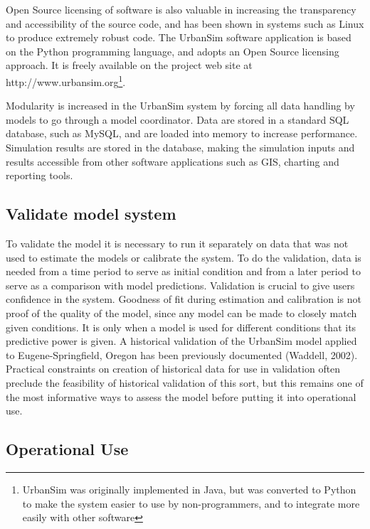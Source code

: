 Open Source licensing of software is also valuable in increasing the transparency and accessibility of the source code, and has been shown in systems such as Linux to produce extremely robust code.  The UrbanSim software application is based on the Python programming language, and adopts an Open Source licensing approach.  It is freely available on the project web site at http://www.urbansim.org\footnote{UrbanSim was originally implemented in Java, but was converted to Python to make the system easier to use by non-programmers, and to integrate more easily with other software}.

Modularity is increased in the UrbanSim system by forcing all data handling by models to go through a model coordinator.  Data are stored in a standard SQL database, such as MySQL, and are loaded into memory to increase performance.  Simulation results are stored in the database, making the simulation inputs and results accessible from other software applications such as GIS, charting and reporting tools.

\subsection{Validate model system}

To validate the model it is necessary to run it separately on data that was not used to estimate the models or calibrate the system. To do the validation, data is needed from a time period to serve as initial condition and from a later period to serve as a comparison with model predictions. Validation is crucial to give users confidence in the system. Goodness of fit during estimation and calibration is not proof of the quality of the model, since any model can be made to closely match given conditions. It is only when a model is used for different conditions that its predictive power is given.  A historical validation of the UrbanSim model applied to Eugene-Springfield, Oregon has been previously documented (Waddell, 2002).  Practical constraints on creation of historical data for use in validation often preclude the feasibility of historical validation of this sort, but this remains one of the most informative ways to assess the model before putting it into operational use.

\subsection{Operational Use}

